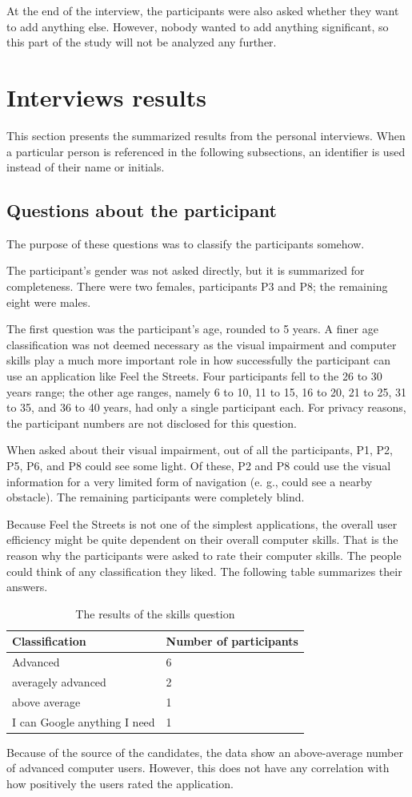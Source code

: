 \documentclass[nolof,digital]{fithesis3}
\begin{document}
At the end of the interview, the participants were also asked whether they want to add anything else. However, nobody wanted to add anything significant, so this part of the study will not be analyzed any further.
\section{Interviews results}
This section presents the summarized results from the personal interviews. When a particular person is referenced in the following subsections, an identifier is used instead of their name or initials.
\subsection{Questions about the participant}
The purpose of these questions was to classify the participants somehow.

The participant's gender was not asked directly, but it is summarized for completeness. There were two females, participants P3 and P8; the remaining eight were males.

The first question was the participant's age, rounded to 5 years. A finer age classification was not deemed necessary as the visual impairment and computer skills play a much more important role in how successfully the participant can use an application like Feel the Streets. Four participants fell to the 26 to 30 years range; the other age ranges, namely 6 to 10, 11 to 15, 16 to 20, 21 to 25, 31 to 35, and 36 to 40 years, had only a single participant each. For privacy reasons, the participant numbers are not disclosed for this question.

When asked about their visual impairment, out of all the participants, P1, P2, P5, P6, and P8 could see some light. Of these, P2 and P8 could use the visual information for a very limited form of navigation (e. g., could see a nearby obstacle). The remaining participants were completely blind.

Because Feel the Streets is not one of the simplest applications, the overall user efficiency might be quite dependent on their overall computer skills. That is the reason why the participants were asked to rate their computer skills. The people could think of any classification they liked. The following table summarizes their answers.
\begin{table}
\caption{The results of the skills question}
\begin{tabularx}{\textwidth}{ |X|X| }
Classification & Number of participants \\
\hline
Advanced & 6 \\
averagely advanced & 2 \\
above average & 1 \\
I can Google anything I need & 1 \\
\end{tabularx}
\end{table}
Because of the source of the candidates, the data show an above-average number of advanced computer users. However, this does not have any correlation with how positively the users rated the application.
\end{document}
